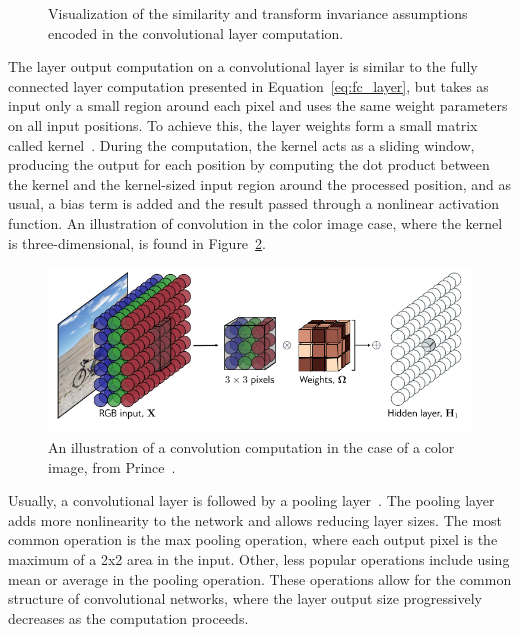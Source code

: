\documentclass[english,twoside,openright]{UH_DS_MSc}
\begin{document}
\begin{figure}[ht]
    \caption{Visualization of the similarity and transform invariance assumptions encoded in the convolutional layer computation.}
    \label{fig:conv_assumptions}
\end{figure}

The layer output computation on a convolutional layer is similar to the fully connected layer computation
presented in Equation~\ref{eq:fc_layer}, but takes as input only a small region around each pixel and uses the same weight parameters on all input positions. To achieve this, the layer weights form a small matrix called kernel~\cite{princebook}. During the computation, the kernel 
acts as a sliding window, producing the output for each position by computing the dot product between the kernel and the kernel-sized input region around the processed position, and as usual, a bias term is added and the result passed through a nonlinear activation function. An illustration of convolution in the color image case, where the kernel is three-dimensional,
is found in Figure~\ref{image:3dkernel}.

\begin{figure}[ht]
    \centering
    \includegraphics*[scale=0.4]{images/3dkernel.png}
    \caption{An illustration of a convolution computation in the case of a color image, from Prince~\cite{princebook}.}
    \label{image:3dkernel}
\end{figure}

Usually, a convolutional layer is followed by a pooling layer~\cite{princebook}. The pooling layer adds more nonlinearity to the network and allows reducing layer sizes. The most common operation is the max pooling operation, where each output pixel is the maximum of
a 2x2 area in the input. Other, less popular operations include using mean or average in the pooling operation. These operations allow for the common structure of convolutional networks, where the layer output size progressively decreases as the computation proceeds.
\end{document}
